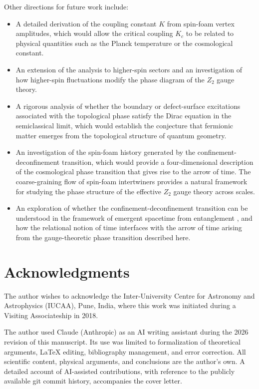 \documentclass[preprint]{SciPost}
\theoremstyle{plain} %
\begin{document}
Other directions for future work include:
\begin{itemize}
	\item A detailed derivation of the coupling constant $ K $ from spin-foam vertex amplitudes, which would allow the critical coupling $ K_c $ to be related to physical quantities such as the Planck temperature or the cosmological constant.
	\item An extension of the analysis to higher-spin sectors and an investigation of how higher-spin fluctuations modify the phase diagram of the $ Z_2 $ gauge theory.
	\item A rigorous analysis of whether the boundary or defect-surface excitations associated with the topological phase satisfy the Dirac equation in the semiclassical limit, which would establish the conjecture that fermionic matter emerges from the topological structure of quantum geometry.
	\item An investigation of the spin-foam history generated by the confinement-deconfinement transition, which would provide a four-dimensional description of the cosmological phase transition that gives rise to the arrow of time. The coarse-graining flow of spin-foam intertwiners \cite{Dittrich2016Coarse} provides a natural framework for studying the phase structure of the effective $ Z_2 $ gauge theory across scales.
	\item An exploration of whether the confinement-deconfinement transition can be understood in the framework of emergent spacetime from entanglement \cite{Cao2018Bulk}, and how the relational notion of time \cite{Hohn2021The-Trinity} interfaces with the arrow of time arising from the gauge-theoretic phase transition described here.
\end{itemize}

\section*{Acknowledgments}

The author wishes to acknowledge the Inter-University Centre for Astronomy and Astrophysics (IUCAA), Pune, India, where this work was initiated during a Visiting Associateship in 2018.

The author used Claude (Anthropic) as an AI writing assistant during the 2026 revision of this manuscript. Its use was limited to formalization of theoretical arguments, LaTeX editing, bibliography management, and error correction. All scientific content, physical arguments, and conclusions are the author's own. A detailed account of AI-assisted contributions, with reference to the publicly available git commit history, accompanies the cover letter.
\end{document}
